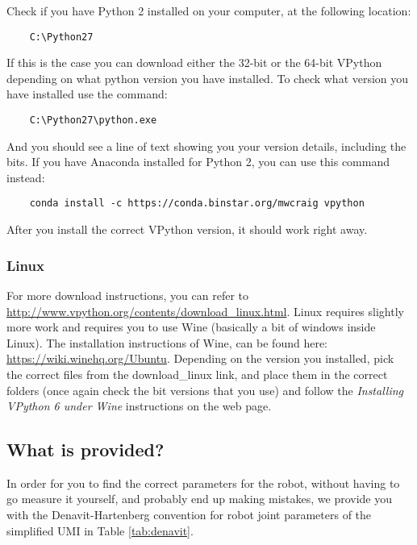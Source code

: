 \documentclass{article}
\begin{document}
Check if you have Python 2 installed on your computer, at the following location:

\begin{verbatim}
    C:\Python27
\end{verbatim}
If this is the case you can download either the 32-bit or the 64-bit VPython depending on what python version you have installed. To check what version you have installed use the command:

\begin{verbatim}
    C:\Python27\python.exe
\end{verbatim}
And you should see a line of text showing you your version details, including the bits. If you have Anaconda installed for Python 2, you can use this command instead:

\begin{verbatim}
    conda install -c https://conda.binstar.org/mwcraig vpython
\end{verbatim}
After you install the correct VPython version, it should work right away.
\subsubsection*{Linux}
For more download instructions, you can refer to \url{http://www.vpython.org/contents/download_linux.html}.
Linux requires slightly more work and requires you to use Wine (basically a bit of windows inside Linux). The installation instructions of Wine, can be found here: \url{https://wiki.winehq.org/Ubuntu}. Depending on the version you installed, pick the correct files from the download\_linux link, and place them in the correct folders (once again check the bit versions that you use) and follow the \emph{Installing VPython 6 under Wine} instructions on the web page.

\subsection*{What is provided?}

In order for you to find the correct parameters for the robot, without having to go measure it yourself, and probably end up making mistakes, we provide you with the Denavit-Hartenberg convention for robot joint parameters of the simplified UMI in Table \ref{tab:denavit}.
\end{document}
